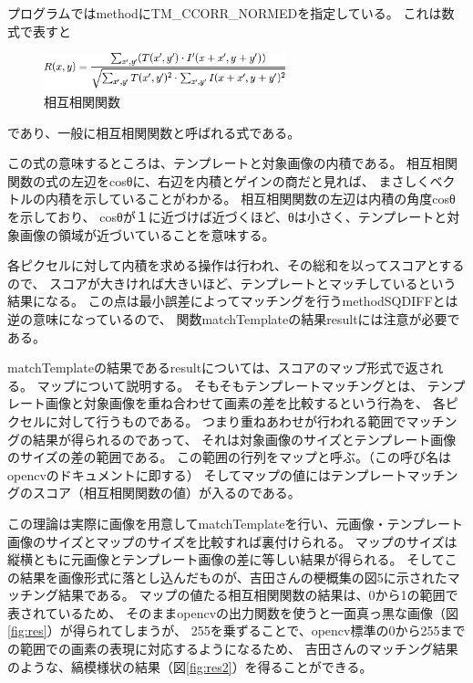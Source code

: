 \documentclass{jsarticle}
\begin{document}
\begin{multicols}{2}
プログラムではmethodにTM\_CCORR\_NORMEDを指定している。
これは数式で表すと
\begin{figure}[H]
  \begin{center}
    \includegraphics[clip,width=7.0cm]{./img/ccorr.png}
    \caption{相互相関関数}
    \label{fig:ccorr}
  \end{center}
\end{figure}
であり、一般に相互相関関数と呼ばれる式である。

この式の意味するところは、テンプレートと対象画像の内積である。
相互相関関数の式の左辺をcosθに、右辺を内積とゲインの商だと見れば、
まさしくベクトルの内積を示していることがわかる。
相互相関関数の左辺は内積の角度cosθを示しており、
cosθが１に近づけば近づくほど、θは小さく、テンプレートと対象画像の領域が近づいていることを意味する。

各ピクセルに対して内積を求める操作は行われ、その総和を以ってスコアとするので、
スコアが大きければ大きいほど、テンプレートとマッチしているという結果になる。
この点は最小誤差によってマッチングを行うmethodSQDIFFとは逆の意味になっているので、
関数matchTemplateの結果resultには注意が必要である。

matchTemplateの結果であるresultについては、スコアのマップ形式で返される。
マップについて説明する。
そもそもテンプレートマッチングとは、
テンプレート画像と対象画像を重ね合わせて画素の差を比較するという行為を、
各ピクセルに対して行うものである。
つまり重ねあわせが行われる範囲でマッチングの結果が得られるのであって、
それは対象画像のサイズとテンプレート画像のサイズの差の範囲である。
この範囲の行列をマップと呼ぶ。（この呼び名はopencvのドキュメント\cite{matchTemplateC}\cite{matchTemplatePy}に即する）
そしてマップの値にはテンプレートマッチングのスコア（相互相関関数の値）が入るのである。

この理論は実際に画像を用意してmatchTemplateを行い、元画像・テンプレート画像のサイズとマップのサイズを比較すれば裏付けられる。
マップのサイズは縦横ともに元画像とテンプレート画像の差に等しい結果が得られる。
そしてこの結果を画像形式に落とし込んだものが、吉田さんの梗概集の図5に示されたマッチング結果である。
マップの値たる相互相関関数の結果は、0から1の範囲で表されているため、
そのままopencvの出力関数を使うと一面真っ黒な画像（図\ref{fig:res}）が得られてしまうが、
255を乗ずることで、opencv標準の0から255までの範囲での画素の表現に対応するようになるため、
吉田さんのマッチング結果のような、縞模様状の結果（図\ref{fig:res2}）を得ることができる。


\end{multicols}
\end{document}
